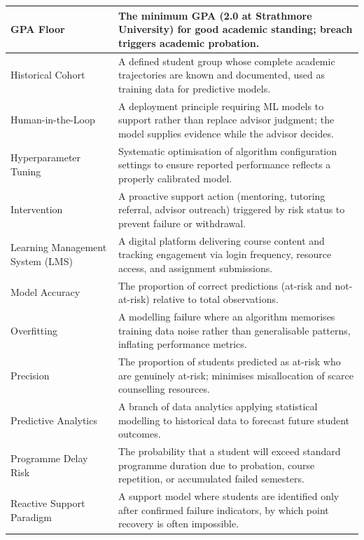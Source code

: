 \documentclass[12pt]{report}
\begin{document}
\begin{center}
\begin{longtable}{|L{3.8cm}|L{10cm}|}
 GPA Floor & The minimum GPA (2.0 at Strathmore University) for good academic standing; breach triggers academic probation. \\ \hline
{} Historical Cohort & A defined student group whose complete academic trajectories are known and documented, used as training data for predictive models. \\ \hline
{} Human-in-the-Loop & A deployment principle requiring ML models to support rather than replace advisor judgment; the model supplies evidence while the advisor decides. \\ \hline
{} Hyperparameter Tuning & Systematic optimisation of algorithm configuration settings to ensure reported performance reflects a properly calibrated model. \\ \hline
{} Intervention & A proactive support action (mentoring, tutoring referral, advisor outreach) triggered by risk status to prevent failure or withdrawal. \\ \hline
{} Learning Management System (LMS) & A digital platform delivering course content and tracking engagement via login frequency, resource access, and assignment submissions. \\ \hline
{} Model Accuracy & The proportion of correct predictions (at-risk and not-at-risk) relative to total observations. \\ \hline
{} Overfitting & A modelling failure where an algorithm memorises training data noise rather than generalisable patterns, inflating performance metrics. \\ \hline
{} Precision & The proportion of students predicted as at-risk who are genuinely at-risk; minimises misallocation of scarce counselling resources. \\ \hline
{} Predictive Analytics & A branch of data analytics applying statistical modelling to historical data to forecast future student outcomes. \\ \hline
{} Programme Delay Risk & The probability that a student will exceed standard programme duration due to probation, course repetition, or accumulated failed semesters. \\ \hline
{} Reactive Support Paradigm & A support model where students are identified only after confirmed failure indicators, by which point recovery is often impossible. \\ \hline

\end{longtable}
\end{center}
\end{document}
